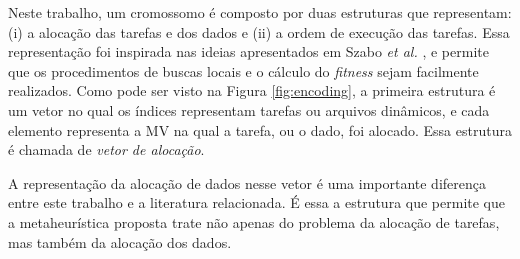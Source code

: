 Neste trabalho, um cromossomo é composto por duas estruturas que representam: (i) a alocação das tarefas e dos dados e (ii) a ordem de execução das tarefas. Essa representação foi inspirada nas ideias apresentados em Szabo \textit{et al.} \cite{Szabo2013}, e permite que os procedimentos de buscas locais e o cálculo do \textit{fitness} sejam facilmente realizados.
Como pode ser visto na Figura \ref{fig:encoding}, a primeira estrutura é um vetor no qual os índices representam tarefas ou arquivos dinâmicos, e cada elemento representa a MV na qual a tarefa, ou o dado, foi alocado. Essa estrutura é chamada de \textit{vetor de alocação}. 


A representação da alocação de dados nesse vetor é uma importante diferença entre este trabalho e a literatura relacionada. É essa a estrutura que permite que a metaheurística proposta trate não apenas do problema da alocação de tarefas, mas também da alocação dos dados.


